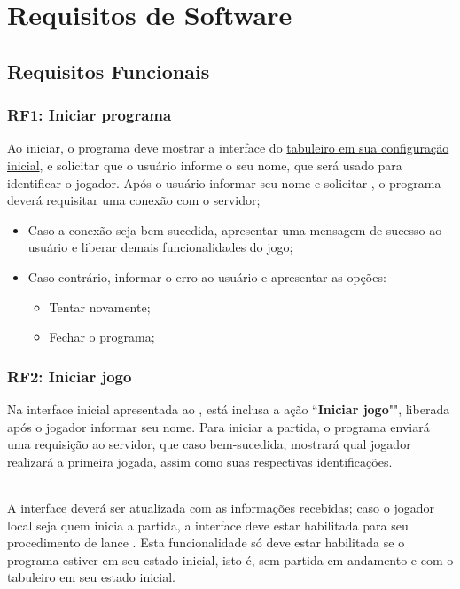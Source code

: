 \chapter{Requisitos de Software}

\section{Requisitos Funcionais}

\subsection{RF1: Iniciar programa}\label{subsection:RF1}
Ao iniciar, o programa deve mostrar a interface do \hyperref[fig:configuracao tabuleiro]{tabuleiro em sua configuração
inicial}, e solicitar que o usuário informe o seu nome, que será usado para identificar o jogador. Após o usuário 
informar seu nome e solicitar , o programa deverá requisitar uma conexão com o servidor;
\begin{itemize}
  \item Caso a conexão seja bem sucedida, apresentar uma mensagem de sucesso ao usuário e liberar demais funcionalidades do jogo;
  \item Caso contrário, informar o erro ao usuário e apresentar as opções:
    \begin{itemize}
        \item Tentar novamente;
        \item Fechar o programa;
    \end{itemize}
\end{itemize}

\subsection{RF2: Iniciar jogo}\label{subsection:RF2}
Na interface inicial apresentada ao , está inclusa a ação ``\textbf{Iniciar jogo}"",
liberada após o jogador informar seu nome. Para iniciar a partida, o programa enviará uma requisição ao servidor, que
caso bem-sucedida, mostrará qual jogador realizará a primeira jogada, assim como suas respectivas identificações.
\subparagraph{} A interface deverá ser atualizada com as informações recebidas; caso o jogador local seja quem inicia a
partida, a interface deve estar habilitada para seu procedimento de lance . Esta
funcionalidade só deve estar habilitada se o programa estiver em seu estado inicial, isto é, sem partida em andamento e
com o tabuleiro em seu estado inicial. 

